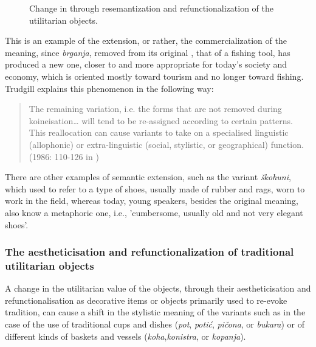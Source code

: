 \documentclass[output=paper]{LSP/langsci}
\begin{document}
\begin{figure}[p]


\caption{Change in  through resemantization and refunctionalization of the utilitarian objects.}
\label{fig:4}
\end{figure}


This is an example of the extension, or rather, the commercialization of the meaning, since \textit{brganja}, removed from its original , that of a fishing tool, has produced a new one, closer to and more appropriate for today’s society and economy, which is oriented mostly toward tourism and no longer toward fishing. Trudgill  explains this phenomenon in the following way: 

\begin{quote}
The remaining variation, i.e. the forms that are not removed during koineisation… will tend to be re-assigned according to certain patterns. This reallocation can cause variants to take on a specialised linguistic (allophonic) or extra-linguistic (social, stylistic, or geographical) function. (1986: 110-126 in \citealt[46]{auer_study_2004})
\end{quote}

There are other examples of semantic extension, such as the variant \textit{škohuni}, which used to refer to a type of shoes, usually made of rubber and rags, worn to work in the field, whereas today, young speakers, besides the original meaning, also know a metaphoric one, i.e., 'cumbersome, usually old and not very elegant shoes'.

\subsubsection{The aestheticisation and refunctionalization of traditional utilitarian objects}

A change in the utilitarian value of the objects, through their aestheticisation and refunctionalisation as decorative items or objects primarily used to re-evoke tradition, can cause a shift in the stylistic meaning of the variants such as in the case of the use of traditional cups and dishes (\textit{pot}, \textit{potić}, \textit{pičona}, or \textit{bukara}) or of different kinds of baskets and vessels (\textit{koha},\textit{konistra}, or \textit{kopanja}). 
\end{document}
